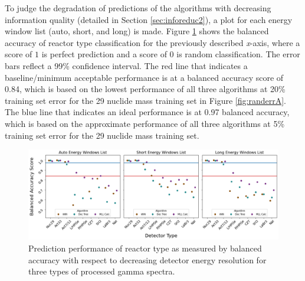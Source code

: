 
To judge the degradation of predictions of the algorithms with decreasing
information quality (detailed in Section \ref{sec:inforeduc2}), a plot for each
energy window list (auto, short, and long) is made.  Figure \ref{fig:rxtr}
shows the balanced accuracy of reactor type classification for the previously
described \textit{x}-axis, where a score of $1$ is perfect prediction and a
score of $0$ is random classification. The error bars reflect a 99\% confidence
interval. The red line that indicates a baseline/minimum acceptable performance
is at a balanced accuracy score of 0.84, which is based on the lowest
performance of all three algorithms at 20\% training set error for the 29
nuclide mass training set in Figure \ref{fig:randerrA}. The blue line that
indicates an ideal performance is at 0.97 balanced accuracy, which is based on
the approximate performance of all three algorithms at 5\% training set error
for the 29 nuclide mass training set. 

\begin{figure}[!htb]
  \centering
  \includegraphics[width=\textwidth]{./chapters/exp2/detector_preds_wrt_enlist_BalAcc_rxtr.png}
  \caption{Prediction performance of reactor type as measured by balanced 
           accuracy with respect to decreasing detector energy resolution 
           for three types of processed gamma spectra.}
  \label{fig:rxtr}
\end{figure}


